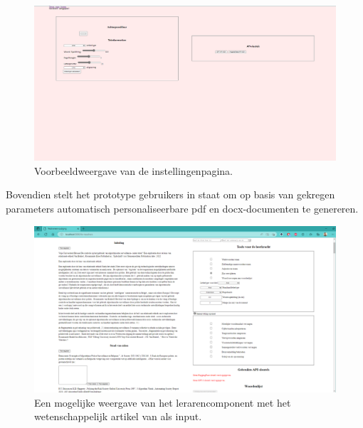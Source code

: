 \begin{center}
	\begin{figure}[H]
		\includegraphics[width=\linewidth]{img/website-instellingen.png}
		\caption{Voorbeeldweergave van de instellingenpagina.}
		\label{img:website-instellingen}
	\end{figure}
\end{center}

Bovendien stelt het prototype gebruikers in staat om op basis van gekregen parameters automatisch personaliseerbare pdf en docx-documenten te genereren.

\begin{figure}
	\includegraphics[width=\linewidth]{img/proto-lerarencomponent.png}
	\caption{Een mogelijke weergave van het lerarencomponent met het wetenschappelijk artikel van \textcite{VanBrakel2022} als input.}
	\label{img:proto-lerarencomponent}
\end{figure}

